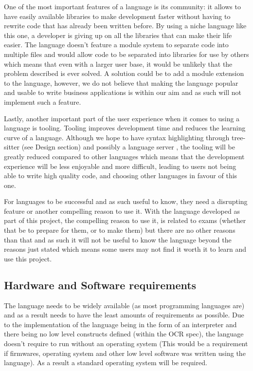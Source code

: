 \documentclass{article}
\begin{document}
One of the most important features of a language is its community: it allows to
have easily available libraries to make development faster without having to
rewrite code that has already been written before. By using a niche language
like this one, a developer is giving up on all the libraries that can make
their life easier. The language doesn't feature a module system to separate
code into multiple files and would allow code to be separated into libraries
for use by others which means that even with a larger user base, it would be
unlikely that the problem described is ever solved. A solution could be to add
a module extension to the language, however, we do not believe that making the
language popular and usable to write business applications is within our aim
and as such will not implement such a feature.


Lastly, another important part of the user experience when it comes to using a
language is tooling. Tooling improves development time and reduces the learning
curve of a language. Although we hope to have syntax highlighting through
tree-sitter (see Design section) and possibly a language server \cite{lsp}, the
tooling will be greatly reduced compared to other languages which means that
the development experience will be less enjoyable and more difficult, leading
to users not being able to write high quality code, and choosing other
languages in favour of this one.

For languages to be successful and as such useful to know, they need a
disrupting feature or another compelling reason to use it. With the language
developed as part of this project, the compelling reason to use it, is related
to exams (whether that be to prepare for them, or to make them) but there are
no other reasons than that and as such it will not be useful to know the
language beyond the reasons just stated which means some users may not find it
worth it to learn and use this project.

\subsection{Hardware and Software requirements}

The language needs to be widely available (as most programming languages are)
and as a result needs to have the least amounts of requirements as possible.
Due to the implementation of the language being in the form of an interpreter
and there being no low level constructs defined (within the OCR spec), the
language doesn't require to run without an operating system (This would be a
requirement if firmwares, operating system and other low level software was
written using the language). As a result a standard operating system will be
required.
\end{document}
